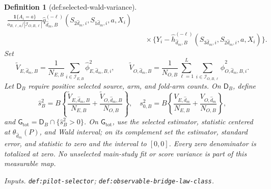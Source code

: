 \documentclass{article}
\newtheorem{definition}{Definition}
\begin{document}
\begin{definition}[def:selected-wald-variance]
\[\begin{aligned}
\frac{\mathbf1\{A_i=a\}}{o_{B,\ell,a}/|\mathcal I_{O,B,\ell}|}
\widehat q_{\widehat d_m,B}^{(-\ell)}(S_{2\widehat d_m,i},S_{1\widehat d_m,i},a,X_i)\\
&\quad\times\bigl\{Y_i-\widehat h_{\widehat d_m,B}^{(-\ell)}
(S_{3\widehat d_m,i},S_{2\widehat d_m,i},a,X_i)\bigr\}.
\end{aligned}
\]
Set
\[
\widetilde V_{E,\widehat d_m,B}
=\frac1{N_{E,B}}\sum_{i\in\mathcal I_{E,B}}
\widehat\phi_{E,\widehat d_m,B,i}^2,
\qquad
\widetilde V_{O,\widehat d_m,B}
=\frac1{N_{O,B}}\sum_{\ell=1}^L\sum_{i\in\mathcal I_{O,B,\ell}}
\widehat\phi_{O,\widehat d_m,B,i}^2.
\]
Let \(\mathsf D_B\) require positive selected source, arm, and fold-arm counts. On \(\mathsf D_B\), define
\[
\widehat s_B^2=B\left\{\frac{\widetilde V_{E,\widehat d_m,B}}{N_{E,B}}+\frac{\widetilde V_{O,\widehat d_m,B}}{N_{O,B}}\right\},
\quad
s_{0,B}^2=B\left\{\frac{V_{E,\widehat d_m}}{N_{E,B}}+\frac{V_{O,\widehat d_m}}{N_{O,B}}\right\},
\]
and \(\mathsf G_{\mathrm{tot}}=\mathsf D_B\cap\{\widehat s_B^2>0\}\). On \(\mathsf G_{\mathrm{tot}}\), use the selected estimator, statistic centered at \(\theta_{\widehat d_m}(P)\), and Wald interval; on its complement set the estimator, standard error, and statistic to zero and the interval to \([0,0]\). Every zero denominator is totalized at zero. No unselected main-study fit or score variance is part of this measurable map.
\par\smallskip\noindent\emph{Inputs.} \texttt{def:\allowbreak{}pilot-\allowbreak{}selector}; \texttt{def:\allowbreak{}observable-\allowbreak{}bridge-\allowbreak{}law-\allowbreak{}class}.
\end{definition}
\end{document}
